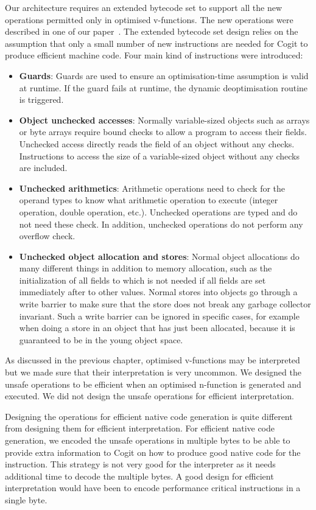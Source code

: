 \documentclass[a4paper,12pt,twoside]{../includes/ThesisStyle}
\begin{document}
Our architecture requires an extended bytecode set to support all the new operations permitted only in optimised v-functions. The new operations were described in one of our paper~\cite{Bera14a}. The extended bytecode set design relies on the assumption that only a small number of new instructions are needed for Cogit to produce efficient machine code. Four main kind of instructions were introduced:
\begin{itemize}
\item \textbf{Guards}: Guards are used to ensure an optimisation-time assumption is valid at runtime. If the guard fails at runtime, the dynamic deoptimisation routine is triggered.
\item \textbf{Object unchecked accesses}: Normally variable-sized objects such as arrays or byte arrays require bound checks to allow a program to access their fields. Unchecked access directly reads the field of an object without any checks. Instructions to access the size of a variable-sized object without any checks are included.
\item \textbf{Unchecked arithmetics}: Arithmetic operations need to check for the operand types to know what arithmetic operation to execute (integer operation, double operation, etc.). Unchecked operations are typed and do not need these check. In addition, unchecked operations do not perform any overflow check.
\item \textbf{Unchecked object allocation and stores}: Normal object allocations do many different things in addition to memory allocation, such as the initialization of all fields to  which is not needed if all fields are set immediately after to other values. Normal stores into objects go through a write barrier to make sure that the store does not break any garbage collector invariant. Such a write barrier can be ignored in specific cases, for example when doing a store in an object that has just been allocated, because it is guaranteed to be in the young object space.
\end{itemize}

As discussed in the previous chapter, optimised v-functions may be interpreted but we made sure that their interpretation is very uncommon. We designed the unsafe operations to be efficient when an optimised n-function is generated and executed. We did not design the unsafe operations for efficient interpretation. 

Designing the operations for efficient native code generation is quite different from designing them for efficient interpretation. For efficient native code generation, we encoded the unsafe operations in multiple bytes to be able to provide extra information to Cogit on how to produce good native code for the instruction. This strategy is not very good for the interpreter as it needs additional time to decode the multiple bytes. A good design for efficient interpretation would have been to encode performance critical instructions in a single byte.
\end{document}
